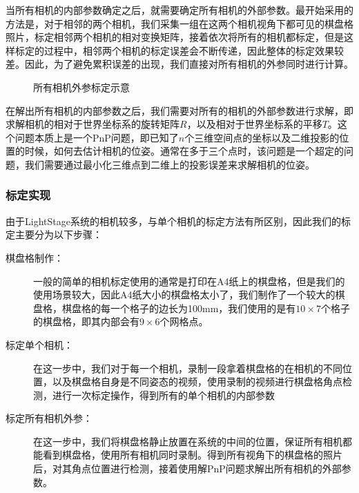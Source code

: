 当所有相机的内部参数确定之后，就需要确定所有相机的外部参数。最开始采用的方法是，对于相邻的两个相机，我们采集一组在这两个相机视角下都可见的棋盘格照片，标定相邻两个相机的相对变换矩阵，接着依次将所有的相机都标定，但是这样标定的过程中，相邻两个相机的标定误差会不断传递，因此整体的标定效果较差。因此，为了避免累积误差的出现，我们直接对所有相机的外参同时进行计算。
\begin{figure}[htbp]
    \centering
    \caption{所有相机外参标定示意\label{fig:calall}}
\end{figure}
在解出所有相机的内部参数之后，我们需要对所有的相机的外部参数进行求解，即求解相机的相对于世界坐标系的旋转矩阵\(R\)，以及相对于世界坐标系的平移\(T\)。这个问题本质上是一个PnP问题，即已知了\(n\)个三维空间点的坐标以及二维投影的位置的时候，如何去估计相机的位姿。通常在多于三个点时，该问题是一个超定的问题，我们需要通过最小化三维点到二维上的投影误差来求解相机的位姿。

\subsubsection{标定实现}
由于LightStage系统的相机较多，与单个相机的标定方法有所区别，因此我们的标定主要分为以下步骤：
\begin{description}
    \item[棋盘格制作：]一般的简单的相机标定使用的通常是打印在A4纸上的棋盘格，但是我们的使用场景较大，因此A4纸大小的棋盘格太小了，我们制作了一个较大的棋盘格，棋盘格的每一个格子的边长为100mm，我们使用的是有\(10\times 7\)个格子的棋盘格，即其内部会有\(9\times 6\)个网格点。
    \item[标定单个相机：]在这一步中，我们对于每一个相机，录制一段拿着棋盘格的在相机的不同位置，以及棋盘格自身是不同姿态的视频，使用录制的视频进行棋盘格角点检测，进行一次标定操作，得到所有的单个相机的内部参数
    \item[标定所有相机外参：]在这一步中，我们将棋盘格静止放置在系统的中间的位置，保证所有相机都能看到棋盘格，使用所有相机同时录制。得到所有视角下的棋盘格的照片后，对其角点位置进行检测，接着使用解PnP问题求解出所有相机的外部参数。
\end{description}

